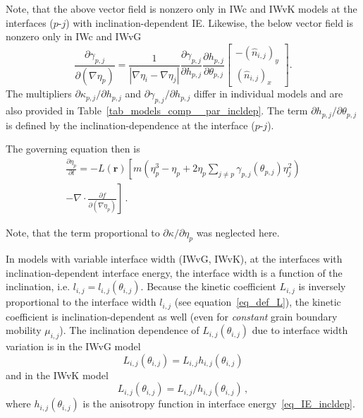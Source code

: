 Note, that the above vector field is nonzero only in IWc and IWvK models at the interfaces ($p$-$j$) with inclination-dependent IE. Likewise, the below vector field is nonzero only in IWc and IWvG
\begin{equation} \label{eq_dgmmijdGp}
	\frac{\partial \gamma_{p,j}}{\partial (\nabla\eta_p)} = \frac{1}{|\nabla\eta_i-\nabla\eta_j|}\frac{\partial \gamma_{p,j}}{\partial h_{p,j}}\frac{\partial h_{p,j}}{\partial \theta_{p,j}} \left[\begin{array}{c}
		-(\hat{n}_{i,j})_y   \\
		(\hat{n}_{i,j})_x
	\end{array} \right].
\end{equation}
The multipliers $\partial \kappa_{p,j}/\partial h_{p,j}$ and $\partial \gamma_{p,j}/\partial h_{p,j}$ differ in individual models and are also provided in Table~\ref{tab_models_comp__par_incldep}. The term $\partial h_{p,j}/\partial \theta_{p,j}$ is defined by the inclination-dependence at the interface ($p$-$j$).

The governing equation then is
\begin{equation}
	\begin{split}
		\frac{\partial \eta_p}{\partial t} = -L(\bm{r})\left[ m\left( \eta_p^3-\eta_p +  2\eta_p\sum_{j\neq p}\gamma_{p,j}(\theta_{p,j})\eta_j^2 \right) \right. \\ 
		\left.  -\nabla\cdot \frac{\partial f}{\partial(\nabla \eta_p)} \right] \,.
	\end{split}
\end{equation}

Note, that the term proportional to $\partial \kappa/\partial\eta_p$ was neglected here. 

In models with variable interface width (IWvG, IWvK), at the interfaces with inclination-dependent interface energy, the interface width is a function of the inclination, i.e. $l_{i,j}=l_{i,j}(\theta_{i,j})$. Because the kinetic coefficient $L_{i,j}$ is inversely proportional to the interface width $l_{i,j}$ (see equation~\eqref{eq_def_L}), the kinetic coefficient is inclination-dependent as well (even for \textit{constant} grain boundary mobility $\mu_{i,j}$). The inclination dependence of $L_{i,j}(\theta_{i,j})$ due to interface width variation is in the IWvG model
\begin{equation}\label{eq_Lcorr_IWvG}
	L_{i,j}(\theta_{i,j}) = L_{i,j}h_{i,j}(\theta_{i,j})
\end{equation}
and in the IWvK model
\begin{equation}\label{eq_Lcorr_IWvK}
	L_{i,j}(\theta_{i,j}) = L_{i,j}/h_{i,j}(\theta_{i,j}) \,,
\end{equation}
where $h_{i,j}(\theta_{i,j})$ is the anisotropy function in interface energy~\eqref{eq_IE_incldep}.%

